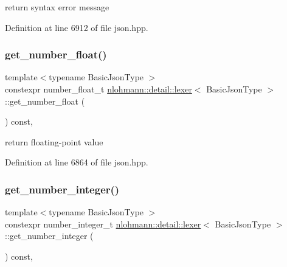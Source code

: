 return syntax error message 



Definition at line 6912 of file json.\+hpp.

\mbox{\label{classnlohmann_1_1detail_1_1lexer_ac013af35a21e9387993b19da5b3e0ae2}} 
\subsubsection{\texorpdfstring{get\_number\_float()}{get\_number\_float()}}
{\footnotesize\ttfamily template$<$typename Basic\+Json\+Type $>$ \\
constexpr number\+\_\+float\+\_\+t \mbox{\hyperlink{classnlohmann_1_1detail_1_1lexer}{nlohmann\+::detail\+::lexer}}$<$ Basic\+Json\+Type $>$\+::get\+\_\+number\+\_\+float (\begin{DoxyParamCaption}{ }\end{DoxyParamCaption}) const\hspace{0.3cm}{\ttfamily [inline]}, {\ttfamily [noexcept]}}



return floating-\/point value 



Definition at line 6864 of file json.\+hpp.

\mbox{\label{classnlohmann_1_1detail_1_1lexer_afa338d17c0a7e834c73104258a2c8ced}} 
\subsubsection{\texorpdfstring{get\_number\_integer()}{get\_number\_integer()}}
{\footnotesize\ttfamily template$<$typename Basic\+Json\+Type $>$ \\
constexpr number\+\_\+integer\+\_\+t \mbox{\hyperlink{classnlohmann_1_1detail_1_1lexer}{nlohmann\+::detail\+::lexer}}$<$ Basic\+Json\+Type $>$\+::get\+\_\+number\+\_\+integer (\begin{DoxyParamCaption}{ }\end{DoxyParamCaption}) const\hspace{0.3cm}{\ttfamily [inline]}, {\ttfamily [noexcept]}}



